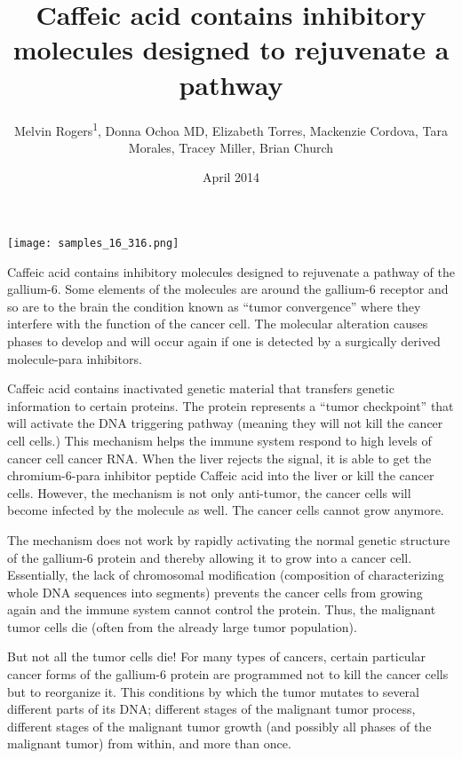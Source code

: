 \documentclass{article}
\title{Caffeic acid contains inhibitory molecules designed to rejuvenate a pathway}
\author{Melvin Rogers\textsuperscript{1},  Donna Ochoa MD,  Elizabeth Torres,  Mackenzie Cordova,  Tara Morales,  Tracey Miller,  Brian Church}
\affil{\textsuperscript{1}Tufts University}
\date{April 2014}
\begin{document}
\maketitle

\begin{center}
\begin{minipage}{0.75\linewidth}
\texttt{[image: samples\_16\_316.png]}
\end{minipage}
\end{center}

Caffeic acid contains inhibitory molecules designed to rejuvenate a pathway of the gallium-6. Some elements of the molecules are around the gallium-6 receptor and so are to the brain the condition known as “tumor convergence” where they interfere with the function of the cancer cell. The molecular alteration causes phases to develop and will occur again if one is detected by a surgically derived molecule-para inhibitors.

Caffeic acid contains inactivated genetic material that transfers genetic information to certain proteins. The protein represents a “tumor checkpoint” that will activate the DNA triggering pathway (meaning they will not kill the cancer cell cells.) This mechanism helps the immune system respond to high levels of cancer cell cancer RNA. When the liver rejects the signal, it is able to get the chromium-6-para inhibitor peptide Caffeic acid into the liver or kill the cancer cells. However, the mechanism is not only anti-tumor, the cancer cells will become infected by the molecule as well. The cancer cells cannot grow anymore.

The mechanism does not work by rapidly activating the normal genetic structure of the gallium-6 protein and thereby allowing it to grow into a cancer cell. Essentially, the lack of chromosomal modification (composition of characterizing whole DNA sequences into segments) prevents the cancer cells from growing again and the immune system cannot control the protein. Thus, the malignant tumor cells die (often from the already large tumor population).

But not all the tumor cells die! For many types of cancers, certain particular cancer forms of the gallium-6 protein are programmed not to kill the cancer cells but to reorganize it. This conditions by which the tumor mutates to several different parts of its DNA; different stages of the malignant tumor process, different stages of the malignant tumor growth (and possibly all phases of the malignant tumor) from within, and more than once.
\end{document}

